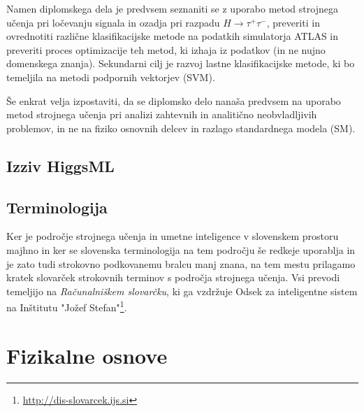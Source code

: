 \documentclass[11pt,a4paper,openany]{book}
\begin{document}
Namen diplomskega dela je predvsem seznaniti se z uporabo metod strojnega učenja pri ločevanju signala in ozadja pri razpadu $H \rightarrow \tau^+\tau^-$, preveriti in ovrednotiti različne klasifikacijske metode na podatkih simulatorja ATLAS in preveriti proces optimizacije teh metod, ki izhaja iz podatkov (in ne nujno domenskega znanja). Sekundarni cilj je razvoj lastne klasifikacijske metode, ki bo temeljila na metodi podpornih vektorjev (SVM).

Še enkrat velja izpostaviti, da se diplomsko delo nanaša predvsem na uporabo metod strojnega učenja pri analizi zahtevnih in analitično neobvladljivih problemov, in ne na fiziko osnovnih delcev in razlago standardnega modela (SM).


\section*{Izziv HiggsML}


\section*{Terminologija}

Ker je področje strojnega učenja in umetne inteligence v slovenskem prostoru majhno in ker se slovenska terminologija na tem področju še redkeje uporablja in je zato tudi strokovno podkovanemu bralcu manj znana, na tem mestu prilagamo kratek slovarček strokovnih terminov s področja strojnega učenja. Vsi prevodi temeljijo na \textit{Računalniškem slovarčku}, ki ga vzdržuje Odsek za inteligentne sistem na Inštitutu "Jožef Stefan"\footnote{\url{http://dis-slovarcek.ijs.si}}.



\chapter{Fizikalne osnove}
\end{document}
